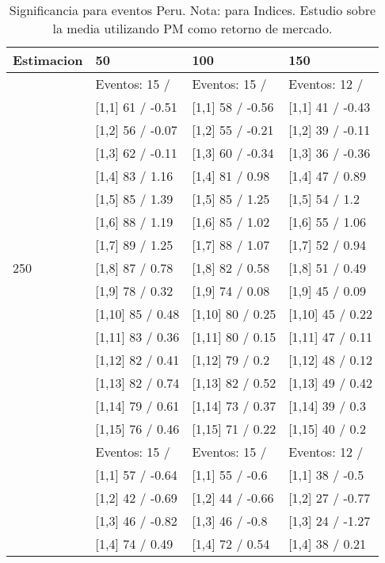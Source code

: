 \begin{table}

\caption{Significancia para eventos Peru. Nota: para Indices. Estudio sobre la media utilizando PM como retorno de mercado.}
\centering
\begin{tabular}[t]{llll}
\toprule
Estimacion & 50 & 100 & 150\\
\midrule
 & Eventos:  15 / & Eventos:  15 / & Eventos:  12 /\\
 & {}[1,1] 61  / -0.51 & {}[1,1] 58  / -0.56 & {}[1,1] 41  / -0.43\\
 & {}[1,2] 56  / -0.07 & {}[1,2] 55  / -0.21 & {}[1,2] 39  / -0.11\\
 & {}[1,3] 62  / -0.11 & {}[1,3] 60  / -0.34 & {}[1,3] 36  / -0.36\\
 & {}[1,4] 83  / 1.16 & {}[1,4] 81  / 0.98 & {}[1,4] 47  / 0.89\\
\addlinespace
 & {}[1,5] 85  / 1.39 & {}[1,5] 85  / 1.25 & {}[1,5] 54  / 1.2\\
 & {}[1,6] 88  / 1.19 & {}[1,6] 85  / 1.02 & {}[1,6] 55  / 1.06\\
 & {}[1,7] 89  / 1.25 & {}[1,7] 88  / 1.07 & {}[1,7] 52  / 0.94\\
250 & {}[1,8] 87  / 0.78 & {}[1,8] 82  / 0.58 & {}[1,8] 51  / 0.49\\
 & {}[1,9] 78  / 0.32 & {}[1,9] 74  / 0.08 & {}[1,9] 45  / 0.09\\
\addlinespace
 & {}[1,10] 85  / 0.48 & {}[1,10] 80  / 0.25 & {}[1,10] 45  / 0.22\\
 & {}[1,11] 83  / 0.36 & {}[1,11] 80  / 0.15 & {}[1,11] 47  / 0.11\\
 & {}[1,12] 82  / 0.41 & {}[1,12] 79  / 0.2 & {}[1,12] 48  / 0.12\\
 & {}[1,13] 82  / 0.74 & {}[1,13] 82  / 0.52 & {}[1,13] 49  / 0.42\\
 & {}[1,14] 79  / 0.61 & {}[1,14] 73  / 0.37 & {}[1,14] 39  / 0.3\\
\addlinespace
 & {}[1,15] 76  / 0.46 & {}[1,15] 71  / 0.22 & {}[1,15] 40  / 0.2\\
 & Eventos:  15 / & Eventos:  15 / & Eventos:  12 /\\
 & {}[1,1] 57  / -0.64 & {}[1,1] 55  / -0.6 & {}[1,1] 38  / -0.5\\
 & {}[1,2] 42  / -0.69 & {}[1,2] 44  / -0.66 & {}[1,2] 27  / -0.77\\
 & {}[1,3] 46  / -0.82 & {}[1,3] 46  / -0.8 & {}[1,3] 24  / -1.27\\
\addlinespace
 & {}[1,4] 74  / 0.49 & {}[1,4] 72  / 0.54 & {}[1,4] 38  / 0.21\\

\end{tabular}
\end{table}
